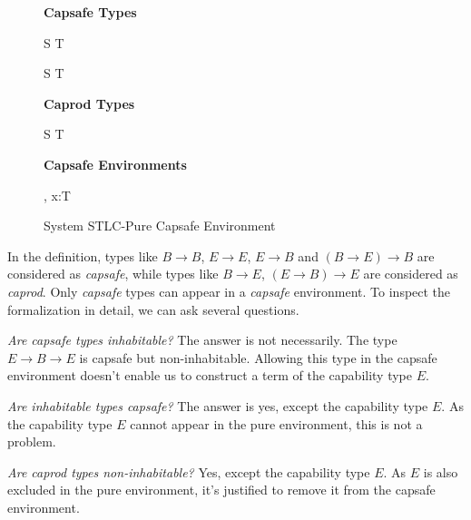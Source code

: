 \begin{figure}[h]
\begin{framed}

\setlength{\columnseprule}{0.4pt}
\begin{multicols}{2}

\textbf{Capsafe Types}


{ S \to T \quad {} }

{ S \to T \quad {} }

\columnbreak

\textbf{Caprod Types}


{ S \to T \quad {} }

\textbf{Capsafe Environments}


{ \Gamma, \; x:T \quad {} }


\end{multicols}
\end{framed}

\caption{System STLC-Pure Capsafe Environment}
\label{fig:stlc-pure-capsafe-definition}
\end{figure}

In the definition, types like $B \to B$, $E \to E$, $E \to B$ and
$(B \to E) \to B$ are considered as \emph{capsafe}, while types like
$B \to E$, $(E \to B) \to E$ are considered as \emph{caprod}. Only
\emph{capsafe} types can appear in a \emph{capsafe} environment. To
inspect the formalization in detail, we can ask several questions.

\emph{Are capsafe types inhabitable?} The answer is not
necessarily. The type $E \to B \to E$ is capsafe but
non-inhabitable. Allowing this type in the capsafe environment doesn't
enable us to construct a term of the capability type $E$.

\emph{Are inhabitable types capsafe?} The answer is yes, except the
capability type $E$. As the capability type $E$ cannot appear in the
pure environment, this is not a problem.

\emph{Are caprod types non-inhabitable?} Yes, except the capability
type $E$. As $E$ is also excluded in the pure environment, it's
justified to remove it from the capsafe environment.

